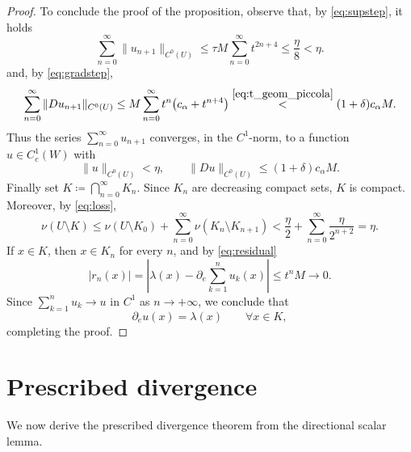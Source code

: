 \documentclass[11pt,a4paper]{article}
\theoremstyle{definition}
\theoremstyle{remark}
\begin{document}
\begin{proof}
To conclude the proof of the proposition, observe that, by \eqref{eq:supstep}, it holds
$$
\sum_{n=0}^\infty \|u_{n+1}\|_{C^0(U)}
\le \tau M \sum_{n=0}^\infty t^{2n+4}
\le \frac{\eta}{8}
< \eta.
$$
and, by \eqref{eq:gradstep},
$$
\sum_{n=0}^\infty \|Du_{n+1}\|_{C^0(U)}
\le M\sum_{n=0}^\infty t^{n}\bigl(c_\alpha+t^{n+4}\bigr)
\overset{\eqref{eq:t_geom_piccola}}{<} (1+\delta)c_\alpha M.
$$
Thus the series $\sum_{n=0}^\infty u_{n+1}$ converges, in the $C^1$-norm, to a function $u \in C^1_c(W)$ with
$$
\|u\|_{C^0(U)} < \eta,
\qquad
\|Du\|_{C^0(U)}\le (1+\delta)c_\alpha M.
$$
Finally set $K\coloneqq \bigcap_{n=0}^\infty K_n$.
Since $K_n$ are decreasing compact sets, $K$ is compact.
Moreover, by \eqref{eq:loss},
$$
\nu(U\setminus K)
\le \nu(U\setminus K_0)+\sum_{n=0}^\infty \nu(K_n\setminus K_{n+1})
< \frac{\eta}{2}+\sum_{n=0}^\infty \frac{\eta}{2^{n+2}}
=\eta.
$$
If $x\in K$, then $x\in K_n$ for every $n$, and by \eqref{eq:residual}
$$
|r_n(x)|=\left|\lambda(x)-\partial_e \sum_{k=1}^{n}u_k(x)\right|\le t^{n}M\to 0.
$$
Since $\sum_{k=1}^{n}u_k\to u$ in $C^1$ as $n \to +\infty$, we conclude that
$$
\partial_e u(x)=\lambda(x)
\qquad\forall x\in K,
$$
completing the proof.
\end{proof}

\section{Prescribed divergence}

We now derive the prescribed divergence theorem from the directional scalar lemma.
\end{document}
